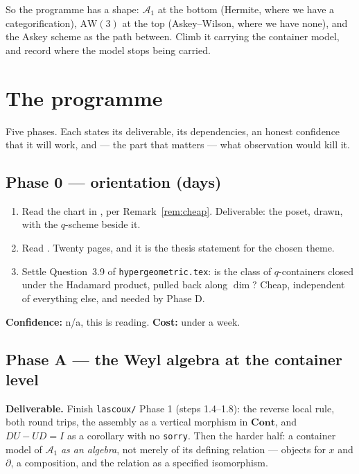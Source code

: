 \documentclass[11pt,a4paper]{article}
\theoremstyle{definition}
\theoremstyle{remark}
\newcommand{\cat}[1]{\mathbf{#1}}
\newcommand{\Cont}{\cat{Cont}}
\newcommand{\AW}{\mathrm{AW}(3)}
\newcommand{\Weyl}{\mathcal{A}_1}
\begin{document}
So the programme has a shape: $\Weyl$ at the bottom (Hermite, where we have a
categorification), $\AW$ at the top (Askey--Wilson, where we have none), and the Askey
scheme as the path between. Climb it carrying the container model, and record where the
model stops being carried.

\section{The programme}

Five phases. Each states its deliverable, its dependencies, an honest confidence that
it will work, and --- the part that matters --- what observation would kill it.

\subsection*{Phase 0 --- orientation (days)}

\begin{enumerate}[nosep,label=\textbf{0.\arabic*}]
  \item Read the chart in \cite{KLS}, per Remark~\ref{rem:cheap}. Deliverable: the
        poset, drawn, with the $q$-scheme beside it.
  \item Read \cite{Zeil90}. Twenty pages, and it is the thesis statement for the
        chosen theme.
  \item Settle Question~3.9 of \texttt{hypergeometric.tex}: is the class of
        $q$-containers closed under the Hadamard product, pulled back along $\dim$?
        Cheap, independent of everything else, and needed by Phase D.
\end{enumerate}

\noindent\textbf{Confidence:} n/a, this is reading. \textbf{Cost:} under a week.

\subsection*{Phase A --- the Weyl algebra at the container level}

\textbf{Deliverable.} Finish \texttt{lascoux/} Phase 1 (steps 1.4--1.8): the reverse
local rule, both round trips, the assembly as a vertical morphism in $\Cont$, and
$DU - UD = I$ as a corollary with no \texttt{sorry}. Then the harder half: a container
model of $\Weyl$ \emph{as an algebra}, not merely of its defining relation ---
objects for $x$ and $\partial$, a composition, and the relation as a specified
isomorphism.
\end{document}
